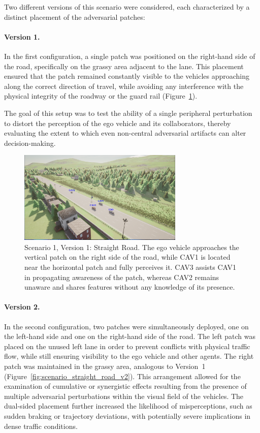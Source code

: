 Two different versions of this scenario were considered, each characterized by a distinct placement of the adversarial patches:

\paragraph{Version 1.}  
In the first configuration, a single patch was positioned on the right-hand side of the road, specifically on the grassy area adjacent to the lane.  
This placement ensured that the patch remained constantly visible to the vehicles approaching along the correct direction of travel, while avoiding any interference with the physical integrity of the roadway or the guard rail (Figure~\ref{fig:scenario_straight_road}).  

The goal of this setup was to test the ability of a single peripheral perturbation to distort the perception of the ego vehicle and its collaborators, thereby evaluating the extent to which even non-central adversarial artifacts can alter decision-making.

\begin{figure}[H]
    \centering
    \includegraphics[width=0.7\textwidth]{figures/experiments/scenario1_v1.png}
    \caption{Scenario 1, Version 1: Straight Road. The ego vehicle approaches the vertical patch on the right side of the road, while CAV1 is located near the horizontal patch and fully perceives it. CAV3 assists CAV1 in propagating awareness of the patch, whereas CAV2 remains unaware and shares features without any knowledge of its presence.}
    \label{fig:scenario_straight_road}
\end{figure}

\paragraph{Version 2.}  
In the second configuration, two patches were simultaneously deployed, one on the left-hand side and one on the right-hand side of the road.  
The left patch was placed on the unused left lane in order to prevent conflicts with physical traffic flow, while still ensuring visibility to the ego vehicle and other agents. The right patch was maintained in the grassy area, analogous to Version~1 (Figure~\ref{fig:scenario_straight_road_v2}).  
This arrangement allowed for the examination of cumulative or synergistic effects resulting from the presence of multiple adversarial perturbations within the visual field of the vehicles. The dual-sided placement further increased the likelihood of misperceptions, such as sudden braking or trajectory deviations, with potentially severe implications in dense traffic conditions.

